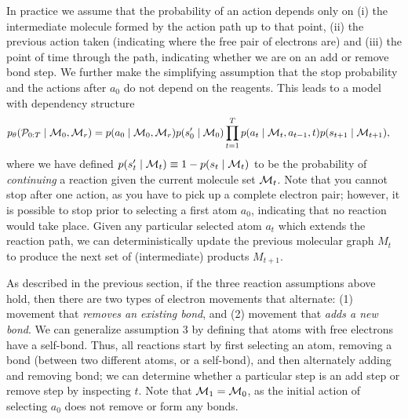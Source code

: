 In practice we assume that the probability of an action depends only on (i) the intermediate molecule formed by the action path up to that point, (ii) the previous action taken (indicating where the free pair of electrons are) and (iii) the point of time through the path, indicating whether we are on an add or remove bond step. 
We further make the simplifying assumption that the stop probability and the actions after $a_0$ do not depend on the reagents. This leads to a model with dependency structure
\begin{align}
p_\theta({\mathcal{P}}_{0:T} \mid {\mathcal{M}}_0, {\mathcal{M}}_r) 
&=
       p(a_0 \mid {\mathcal{M}}_0, {\mathcal{M}}_r)
       p(s'_0 \mid {\mathcal{M}}_0)
\prod_{t=1}^{T} 
	p(a_t \mid {\mathcal{M}}_{t}, a_{t-1}, t)
	p(s_{t+1} \mid {\mathcal{M}}_{t+1}),
\label{eq:jointprob}
\end{align}
where we have defined $p(s'_t \mid {\mathcal{M}}_t) \equiv 1 - p(s_t \mid {\mathcal{M}}_t)$ to be the probability of {\em continuing} a reaction given the current molecule set ${\mathcal{M}}_t$.
%
%
%
Note that you cannot stop after one action, as you have to pick up a complete electron pair;
however, it is possible to stop prior to selecting a first atom $a_0$, indicating that no reaction would take place.
Given any particular selected atom $a_t$ which extends the reaction path, we can deterministically update the previous molecular graph $M_{t}$ to produce the next set of (intermediate) products $M_{t+1}$.

As described in the previous section, if the three reaction assumptions above hold, then there are two types of electron movements that alternate: 
(1) movement that \emph{removes an existing bond}, and 
(2) movement that \emph{adds a new bond}. 
We can generalize assumption 3 by defining that atoms with free electrons have a self-bond. 
Thus, all reactions start by first selecting an atom, removing a bond (between two different atoms, or a self-bond), and then alternately adding and removing bond;
we can determine whether a particular step is an add step or remove step by inspecting $t$.
Note that ${\mathcal{M}}_1 = {\mathcal{M}}_0$, as the initial action of selecting $a_0$ does not remove or form any bonds.


